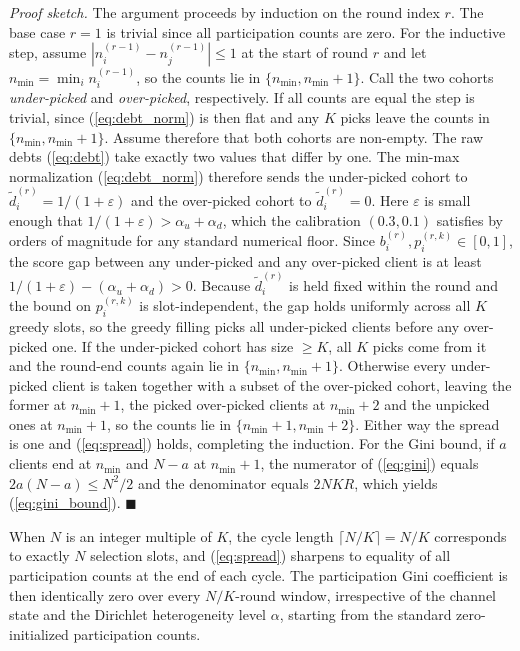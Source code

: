 \documentclass[journal]{IEEEtran}
\newcommand{\revIVE}[1]{#1}
\newcommand{\rev}[1]{{\color{blue}#1}}
\begin{document}
\textit{Proof sketch.} The argument proceeds by induction on the round index $r$. The base case $r = 1$ is trivial since all participation counts are zero. For the inductive step, assume $|n_i^{(r-1)} - n_j^{(r-1)}| \le 1$ at the start of round $r$ and let $n_{\min} = \min_i n_i^{(r-1)}$, so the counts lie in $\{n_{\min}, n_{\min}+1\}$. Call the two cohorts \emph{under-picked} and \emph{over-picked}, respectively. \rev{If all counts are equal the step is trivial, since (\ref{eq:debt_norm}) is then flat and any $K$ picks leave the counts in $\{n_{\min}, n_{\min}+1\}$. Assume therefore that both cohorts are non-empty.} The raw debts (\ref{eq:debt}) take exactly two values that differ by one. The min-max normalization (\ref{eq:debt_norm}) therefore sends the under-picked cohort to $\tilde{d}_i^{(r)} = 1/(1+\varepsilon)$ and the over-picked cohort to $\tilde{d}_i^{(r)} = 0$. \revIVE{Here $\varepsilon$ is small enough that $1/(1+\varepsilon) > \alpha_u + \alpha_d$, which the calibration $(0.3, 0.1)$ satisfies by orders of magnitude for any standard numerical floor.} Since $b_i^{(r)}, p_i^{(r,k)} \in [0,1]$, the score gap between any under-picked and any over-picked client is at least $1/(1+\varepsilon) - (\alpha_u + \alpha_d) > 0$. \revIVE{Because $\tilde{d}_i^{(r)}$ is held fixed within the round and the bound on $p_i^{(r,k)}$ is slot-independent, the gap holds uniformly across all $K$ greedy slots,} so the greedy filling picks all under-picked clients before any over-picked one. If the under-picked cohort has size $\ge K$, all $K$ picks come from it and the round-end counts again lie in $\{n_{\min}, n_{\min}+1\}$. Otherwise every under-picked client is taken together with a subset of the over-picked cohort, leaving the former at $n_{\min}+1$, the picked over-picked clients at $n_{\min}+2$ and the unpicked ones at $n_{\min}+1$, so the counts lie in $\{n_{\min}+1, n_{\min}+2\}$. Either way the spread is one and (\ref{eq:spread}) holds, completing the induction. For the Gini bound, if $a$ clients end at $n_{\min}$ and $N-a$ at $n_{\min}+1$, the numerator of (\ref{eq:gini}) equals $2a(N-a) \le N^2/2$ and the denominator equals $2NKR$, which yields (\ref{eq:gini_bound}). \hfill$\blacksquare$

When $N$ is an integer multiple of $K$, the cycle length $\lceil N/K \rceil = N/K$ corresponds to exactly $N$ selection slots, and (\ref{eq:spread}) sharpens to equality of all participation counts at the end of each cycle. The participation Gini coefficient is then identically zero over every $N/K$-round window, irrespective of the channel state and the Dirichlet heterogeneity level $\alpha$, starting from the standard zero-initialized participation counts.
\end{document}

